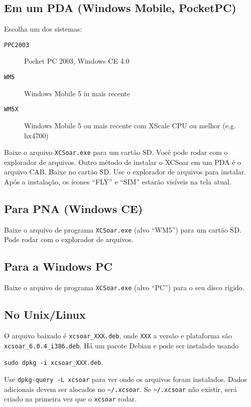 \subsection*{Em um PDA (Windows Mobile, PocketPC)}

Escolha um dos sistemas:

\begin{description}
\item[\texttt{PPC2003}] Pocket PC 2003, Windows CE 4.0
\item[\texttt{WM5}] Windows Mobile 5 iu mais recente
\item[\texttt{WM5X}] Windows Mobile 5 ou mais recente com  XScale CPU ou melhor (e.g. hx4700)
\end{description}

Baixe o arquivo \verb|XCSoar.exe| para um cartão SD.  Você pode  rodar com o explorador de arquivos.
Outro método de instalar o XCSoar em um PDA é o arquivo CAB.  Baixe no cartão SD.  Use o explorador de arquivos para instalar.  Após a instalação, os ícones “FLY” e “SIM” estarão visíveis na tela atual.


\subsection*{Para PNA (Windows CE)}

Baixe o arquivo de programa \verb|XCSoar.exe| (alvo ``WM5'') para um cartão SD.  Pode rodar com o explorador de arquivos.

\subsection*{Para a Windows PC}

Baixe o arquivo de programa \verb|XCSoar.exe| (alvo ``PC'') para o seu disco rígido.

\subsection*{No Unix/Linux}

O arquivo baixado é \verb|xcsoar_XXX.deb|, onde \verb|XXX| a versão e plataforma são \verb|xcsoar_6.0.4_i386.deb|.
Há um pacote Debian e pode ser instalado usando
\begin{center}
\verb|sudo dpkg -i xcsoar_XXX.deb|.
\end{center}
Use \verb|dpkg-query -L xcsoar| para ver onde os arquivos foram instalados.  Dados adicionais devem ser alocados no \verb|~/.xcsoar|.
Se \verb|~/.xcsoar| não existir, será criado na primeira vez que o \verb|xcsoar| rodar.

